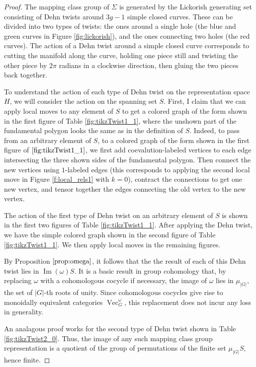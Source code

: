 \documentclass{amsart}
\DeclareMathOperator{\Vect}{Vec}
\DeclareMathOperator{\Img}{Im}
\newcommand{\one}{1}
\newcommand{\Si}{\Sigma}
\begin{document}
\begin{proof}
The mapping class group of $\Si$ is generated by the Lickorish generating set consisting of Dehn twists around $3g-1$ simple closed curves.   These can be divided into two types of twists: the ones around a single hole (the blue and green curves in Figure \ref{fig:lickorish}), and the ones connecting two holes (the red curves). The action of a Dehn twist around a simple closed curve corresponds to cutting the manifold along the curve, holding one piece still and twisting the other piece by $2\pi$ radians in a clockwise direction, then gluing the two pieces back together.


To understand the action of each type of Dehn twist on the representation space $H$, we will consider the action on the spanning set $S$.  First, I claim that we can apply local moves to any element of $S$ to get a colored graph of the form shown in the first figure of Table \ref{fig:tikzTwist1_1}, where the unshown part of the fundamental polygon looks the same as in the definition of $S$.  Indeed, to pass from an arbitrary element of $S$, to a colored graph of the form shown in the first figure of $\ref{fig:tikzTwist1_1}$, we first add coevalution-labeled vertices to each  edge intersecting the three shown sides of the fundamental polygon.  Then connect the new vertices using $\one$-labeled edges (this corresponds to applying the second local move in Figure \ref{f:local_rels1} with  $k = 0$), contract the connections to get one new vertex, and tensor together the edges connecting the old vertex to the new vertex.

The action of the first type of Dehn twist on an arbitrary element of $S$ is shown in the first two figures of Table \ref{fig:tikzTwist1_1}.  
After applying the Dehn twist, we have the simple colored graph shown in the second figure of Table \ref{fig:tikzTwist1_1}.  We then apply local moves in the remaining figures. 

By Proposition $\ref{prop:omega}$, it follows that the  the result of each of this Dehn twist lies in $\Img(\omega) S$.  It is a basic result in group cohomology that, by replacing $\omega$ with a cohomologous cocycle if necessary,  the image of $\omega$ lies in $\mu_{|G|}$, the set of $|G|$-th roots of unity.  Since cohomologous cocycles give rise to monoidally equivalent categories $\Vect_G^\omega$, this replacement does not incur any loss in generality.


An analagous proof works for the second type of Dehn twist shown in Table \ref{fig:tikzTwist2_0}. Thus, the image of any such mapping class group representation is a quotient of the group of permutations of the finite set $\mu_{|G|} S$, hence finite.
\end{proof}
\end{document}
